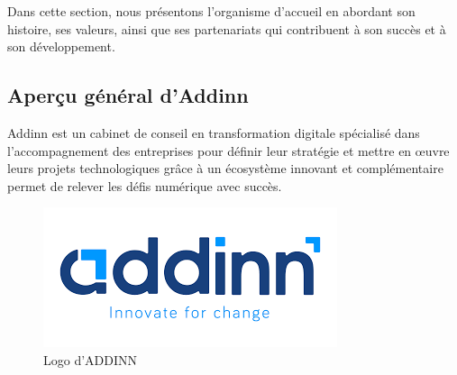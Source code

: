 Dans cette section, nous présentons l’organisme d’accueil en abordant son histoire, ses valeurs, ainsi que ses partenariats qui contribuent à son succès et à son développement.
\subsection{\texorpdfstring{Aperçu général d'Addinn}{Aperçu général d'Addinn}}
    \begin{minipage}{.6\textwidth}
        \justifying
        Addinn est un cabinet de conseil en transformation digitale spécialisé dans l’accompagnement des entreprises pour définir leur stratégie et mettre en œuvre leurs projets technologiques grâce à un écosystème innovant et complémentaire permet de relever les défis numérique avec succès\cite{Addinn}.\\
    \end{minipage}
    \begin{minipage}{.4\textwidth}
        \vspace{-2.1cm}
        \begin{figure}[H]
            \centering
            \includegraphics[width=\linewidth]{pages/page-de-garde/img/logo.png}
            \caption{\centering Logo d'\acs{ADDINN}}
            \label{fig:logo-ADDINN}
        \end{figure}
    \end{minipage}
\vspace{-0.8cm}
